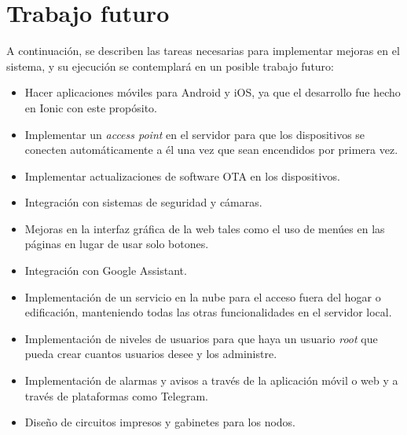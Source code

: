 \section{Trabajo futuro}

A continuación, se describen las tareas necesarias para implementar mejoras en el sistema, y su ejecución se contemplará en un posible trabajo futuro:

\begin{itemize}
	\item Hacer aplicaciones móviles para Android y iOS, ya que el desarrollo fue hecho en Ionic con este propósito.
	\item Implementar un \textit{access point} en el servidor para que los dispositivos se conecten automáticamente a él una vez que sean encendidos por primera vez.
	\item Implementar actualizaciones de software OTA en los dispositivos.
	\item Integración con sistemas de seguridad y cámaras.
	\item Mejoras en la interfaz gráfica de la web tales como el uso de menúes en las páginas en lugar de usar solo botones.
	\item Integración con Google Assistant.
	\item Implementación de un servicio en la nube para el acceso fuera del hogar o edificación, manteniendo todas las otras funcionalidades en el servidor local.
	\item Implementación de niveles de usuarios para que haya un usuario \textit{root} que pueda crear cuantos usuarios desee y los administre.
	\item Implementación de alarmas y avisos a través de la aplicación móvil o web y a través de plataformas como Telegram.
	\item Diseño de circuitos impresos y gabinetes para los nodos.
\end{itemize}